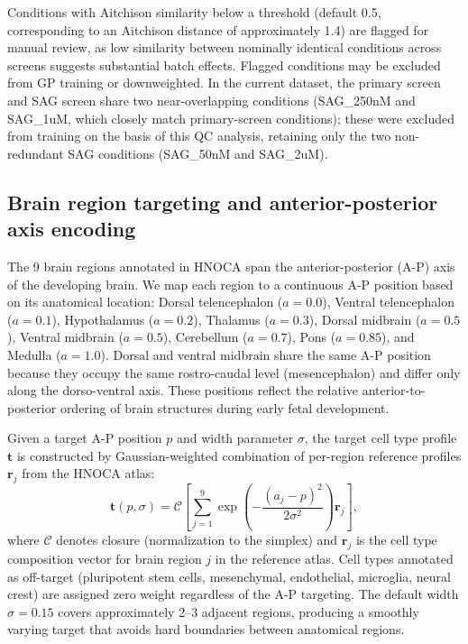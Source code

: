 \documentclass[times,twoside]{zHenriquesLab-StyleBioRxiv}
\newcommand{\hnoca}{\textsc{HNOCA}}
\begin{document}
Conditions with Aitchison similarity below a threshold (default 0.5, corresponding to an Aitchison distance of approximately 1.4) are flagged for manual review, as low similarity between nominally identical conditions across screens suggests substantial batch effects. Flagged conditions may be excluded from GP training or downweighted. In the current dataset, the primary screen and SAG screen share two near-overlapping conditions (SAG\_250nM and SAG\_1uM, which closely match primary-screen conditions); these were excluded from training on the basis of this QC analysis, retaining only the two non-redundant SAG conditions (SAG\_50nM and SAG\_2uM).

\subsection*{Brain region targeting and anterior-posterior axis encoding}

The 9 brain regions annotated in \hnoca{} span the anterior-posterior (A-P) axis of the developing brain. We map each region to a continuous A-P position based on its anatomical location: Dorsal telencephalon ($a{=}0.0$), Ventral telencephalon ($a{=}0.1$), Hypothalamus ($a{=}0.2$), Thalamus ($a{=}0.3$), Dorsal midbrain ($a{=}0.5$), Ventral midbrain ($a{=}0.5$), Cerebellum ($a{=}0.7$), Pons ($a{=}0.85$), and Medulla ($a{=}1.0$). Dorsal and ventral midbrain share the same A-P position because they occupy the same rostro-caudal level (mesencephalon) and differ only along the dorso-ventral axis. These positions reflect the relative anterior-to-posterior ordering of brain structures during early fetal development.

Given a target A-P position $p$ and width parameter $\sigma$, the target cell type profile $\bm{t}$ is constructed by Gaussian-weighted combination of per-region reference profiles $\bm{r}_j$ from the HNOCA atlas:
\begin{equation}
  \bm{t}(p, \sigma) = \mathcal{C}\!\left[\sum_{j=1}^{9} \exp\!\left(-\frac{(a_j - p)^2}{2\sigma^2}\right) \bm{r}_j\right],
\end{equation}
where $\mathcal{C}$ denotes closure (normalization to the simplex) and $\bm{r}_j$ is the cell type composition vector for brain region $j$ in the reference atlas. Cell types annotated as off-target (pluripotent stem cells, mesenchymal, endothelial, microglia, neural crest) are assigned zero weight regardless of the A-P targeting. The default width $\sigma{=}0.15$ covers approximately 2--3 adjacent regions, producing a smoothly varying target that avoids hard boundaries between anatomical regions.
\end{document}
